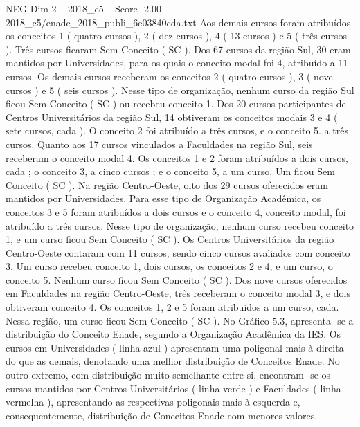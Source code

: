 \begin{textsample}{NEG Dim 2 – 2018\_c5 – Score -2.00 – 2018\_c5/enade\_2018\_publi\_6e03840cda.txt}
Aos demais cursos foram atribuídos os conceitos 1 ( quatro cursos ), 2 ( dez cursos ), 4 ( 13 cursos ) e 5 ( três cursos ).
Três cursos ficaram Sem Conceito ( SC ).
Dos 67 cursos da região Sul, 30 eram mantidos por Universidades, para os quais o conceito modal foi 4, atribuído a 11 cursos.
Os demais cursos receberam os conceitos 2 ( quatro cursos ), 3 ( nove cursos ) e 5 ( seis cursos ).
Nesse tipo de organização, nenhum curso da região Sul ficou Sem Conceito ( SC ) ou recebeu conceito 1.
Dos 20 cursos participantes de Centros Universitários da região Sul, 14 obtiveram os conceitos modais 3 e 4 ( sete cursos, cada ).
O conceito 2 foi atribuído a três cursos, e o conceito 5. a três cursos.
Quanto aos 17 cursos vinculados a Faculdades na região Sul, seis receberam o conceito modal 4.
Os conceitos 1 e 2 foram atribuídos a dois cursos, cada ; o conceito 3, a cinco cursos ; e o conceito 5, a um curso.
Um ficou Sem Conceito ( SC ).
Na região Centro-Oeste, oito dos 29 cursos oferecidos eram mantidos por Universidades.
Para esse tipo de Organização Acadêmica, os conceitos 3 e 5 foram atribuídos a dois cursos e o conceito 4, conceito modal, foi atribuído a três cursos.
Nesse tipo de organização, nenhum curso recebeu conceito 1, e um curso ficou Sem Conceito ( SC ).
Os Centros Universitários da região Centro-Oeste contaram com 11 cursos, sendo cinco cursos avaliados com conceito 3.
Um curso recebeu conceito 1, dois cursos, os conceitos 2 e 4, e um curso, o conceito 5.
Nenhum curso ficou Sem Conceito ( SC ).
Dos nove cursos oferecidos em Faculdades na região Centro-Oeste, três receberam o conceito modal 3, e dois obtiveram conceito 4.
Os conceitos 1, 2 e 5 foram atribuídos a um curso, cada.
Nessa região, um curso ficou Sem Conceito ( SC ).
No Gráfico 5.3, apresenta -se a distribuição do Conceito Enade, segundo a Organização Acadêmica da IES.
Os cursos em Universidades ( linha azul ) apresentam uma poligonal mais à direita do que as demais, denotando uma melhor distribuição de Conceitos Enade.
No outro extremo, com distribuição muito semelhante entre si, encontram -se os cursos mantidos por Centros Universitários ( linha verde ) e Faculdades ( linha vermelha ), apresentando as respectivas poligonais mais à esquerda e, consequentemente, distribuição de Conceitos Enade com menores valores.

\end{textsample}
